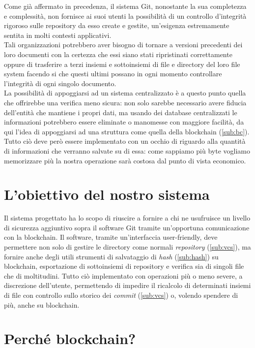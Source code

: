 
Come già affermato in precedenza, il sistema Git,
nonostante la sua completezza e complessità,
non fornisce ai suoi utenti la possibilità di un controllo d'integrità rigoroso
sulle repository da esso create e gestite, un'esigenza estremamente
sentita in molti contesti applicativi. \\
Tali organizzazioni potrebbero aver bisogno di tornare a versioni precedenti
dei loro documenti con la certezza che essi siano stati ripristinati
correttamente oppure di trasferire a terzi insiemi e sottoinsiemi
di file e directory del loro file system facendo si che questi ultimi
possano in ogni momento controllare l'integrità di ogni singolo documento. \\
La possibilità di appoggiarsi ad un sistema centralizzato è a questo punto quella
che offrirebbe una verifica meno sicura: non solo sarebbe necessario avere fiducia
dell'entità che mantiene i propri dati, ma usando dei database centralizzati le informazioni
potrebbero essere eliminate o manomesse con maggiore facilità,
da qui l'idea di appoggiarsi ad una struttura come quella della blockchain (\autoref{sub:bc}).
Tutto ciò deve però essere implementato con un occhio di riguardo alla quantità
di informazioni che verranno salvate su di essa: come sappiamo più byte vogliamo
memorizzare più la nostra operazione sarà costosa dal punto di vista economico.

\section{L'obiettivo del nostro sistema}

Il sistema progettato ha lo scopo di riuscire a fornire a chi ne usufruisce
un livello di sicurezza aggiuntivo sopra il software Git tramite un'opportuna
comunicazione con la blockchain.
Il software, tramite un'interfaccia user-friendly, deve permettere non solo di gestire
le directory come normali \emph{repository} (\autoref{sub:vcs}), ma fornire
anche degli utili strumenti di salvataggio di \emph{hash} (\autoref{sub:hash}) su blockchain,
esportazione di sottoinsiemi di repository
e verifica sia di singoli file che di moltitudini.
Tutto ciò implementato con operazioni più o meno severe, a discrezione dell'utente,
permettendo di impedire il ricalcolo di determinati insiemi di file con controllo
sullo storico dei \emph{commit} (\autoref{sub:vcs}) o, volendo spendere di più, anche su blockchain.

\section{Perché blockchain?}

